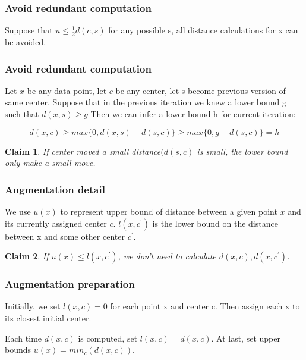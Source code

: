 \documentclass[9pt]{beamer}
\newtheorem{claim}{Claim}
\newcommand{\ccp}[1]{{\color{purple}#1}}
\begin{document}
\begin{frame}
	\frametitle{Avoid redundant computation}
	\begin{corollary}
		Suppose that $u \le \frac{1}{2}d(c, s)$ for any possible s, all distance calculations for x can be avoided.
	\end{corollary}
\end{frame}

\begin{frame}
	\frametitle{Avoid redundant computation}
	Let $x$ be any data point, let $c$ be any center, let s become previous version of same center. Suppose that in the previous iteration we knew a lower bound g such that $d(x, s) \ge g$ Then we can infer a lower bound h for current iteration: \par
	\begin{equation*}
		d(x, c) \ge max\{0, d(x,s)-d(s,c)\} \ge max\{0, g-d(s,c)\} = h
	\end{equation*}
	\pause
	\begin{claim}
		\ccp{If center moved a small distance$(d(s,c)$ is small}, the lower bound only make a small move.
	\end{claim}
\end{frame}



\begin{frame}
	\frametitle{Augmentation detail}
	We use $u(x)$ to represent upper bound of distance between a given point $x$ and its currently assigned center $c$. $l(x,c^{\prime})$ is the lower bound on the distance between x and some other center $c^{\prime}$.\par
	\begin{claim}
		If $u(x) \le l(x,c^{\prime}) $, we don't need to calculate $d(x,c), d(x, c^{\prime})$. \par
	\end{claim}
\end{frame}

\begin{frame}
	\frametitle{Augmentation preparation}
	Initially, we set $l(x,c)=0$ for each point x and center c. Then assign each x to its closest initial center.\par
	Each time $d(x,c)$ is computed, set $l(x,c)=d(x,c)$. At last, set upper bounds $u(x) = min_c(d(x,c))$.

\end{frame}
\end{document}
